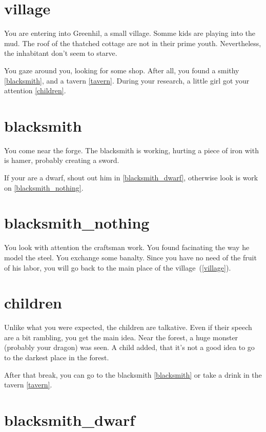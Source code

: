 
\section{village}

You are entering into Greenhil, a small village. Somme kids are playing into
the mud. The roof of the thatched cottage are not in their prime youth.
Nevertheless, the inhabitant don't seem to starve.

You gaze around you, looking for some shop. After all, you found a smithy
\ref{blacksmith}, and a tavern \ref{tavern}. During your research, a little girl
got your attention \ref{children}.

\section{blacksmith}

You come near the forge. The blacksmith is working, hurting a piece of iron with
is hamer, probably creating a sword.

If your are a dwarf, shout out him in \ref{blacksmith_dwarf}, otherwise look is
work on \ref{blacksmith_nothing}.

\section{blacksmith_nothing}

You look with attention the craftsman work. You found facinating the way he
model the steel. You exchange some banalty. Since you have no need of the fruit
of his labor, you will go back to the main place of the village~(\ref{village}).

\section{children}

Unlike what you were expected, the children are talkative. Even if their speech
are a bit rambling, you get the main idea. Near the forest, a huge monster
(probably your dragon) was seen. A child added, that it's not a good idea to go
to the darkest place in the forest.

After that break, you can go to the blacksmith \ref{blacksmith} or take a drink in
the tavern \ref{tavern}.

\section{blacksmith_dwarf}

